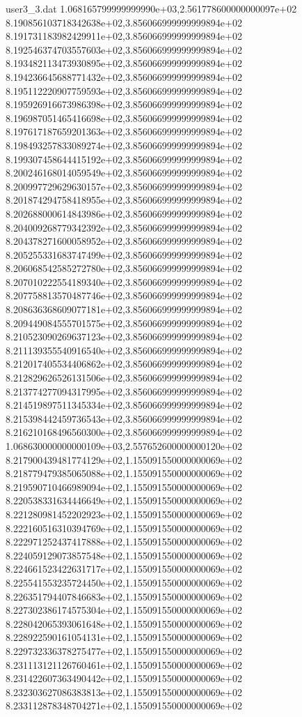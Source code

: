 \begin{filecontents}{user3_3.dat}
1.068165799999999990e+03,2.561778600000000097e+02
8.190856103718342638e+02,3.856066999999999894e+02
8.191731183982429911e+02,3.856066999999999894e+02
8.192546374703557603e+02,3.856066999999999894e+02
8.193482113473930895e+02,3.856066999999999894e+02
8.194236645688771432e+02,3.856066999999999894e+02
8.195112220907759593e+02,3.856066999999999894e+02
8.195926916673986398e+02,3.856066999999999894e+02
8.196987051465416698e+02,3.856066999999999894e+02
8.197617187659201363e+02,3.856066999999999894e+02
8.198493257833089274e+02,3.856066999999999894e+02
8.199307458644415192e+02,3.856066999999999894e+02
8.200246168014059549e+02,3.856066999999999894e+02
8.200997729629630157e+02,3.856066999999999894e+02
8.201874294758418955e+02,3.856066999999999894e+02
8.202688000614843986e+02,3.856066999999999894e+02
8.204009268779342392e+02,3.856066999999999894e+02
8.204378271600058952e+02,3.856066999999999894e+02
8.205255331683747499e+02,3.856066999999999894e+02
8.206068542585272780e+02,3.856066999999999894e+02
8.207010222554189340e+02,3.856066999999999894e+02
8.207758813570487746e+02,3.856066999999999894e+02
8.208636368609077181e+02,3.856066999999999894e+02
8.209449084555701575e+02,3.856066999999999894e+02
8.210523090269637123e+02,3.856066999999999894e+02
8.211139355540916540e+02,3.856066999999999894e+02
8.212017405534406862e+02,3.856066999999999894e+02
8.212829626526131506e+02,3.856066999999999894e+02
8.213774277094317995e+02,3.856066999999999894e+02
8.214519897511345334e+02,3.856066999999999894e+02
8.215398442459736543e+02,3.856066999999999894e+02
8.216210168496560300e+02,3.856066999999999894e+02
1.068630000000000109e+03,2.557652600000000120e+02
8.217900439481774129e+02,1.155091550000000069e+02
8.218779479385065088e+02,1.155091550000000069e+02
8.219590710466989094e+02,1.155091550000000069e+02
8.220538331634446649e+02,1.155091550000000069e+02
8.221280981452202923e+02,1.155091550000000069e+02
8.222160516310394769e+02,1.155091550000000069e+02
8.222971252437417888e+02,1.155091550000000069e+02
8.224059129073857548e+02,1.155091550000000069e+02
8.224661523422631717e+02,1.155091550000000069e+02
8.225541553235724450e+02,1.155091550000000069e+02
8.226351794407846683e+02,1.155091550000000069e+02
8.227302386174575304e+02,1.155091550000000069e+02
8.228042065393061648e+02,1.155091550000000069e+02
8.228922590161054131e+02,1.155091550000000069e+02
8.229732336378275477e+02,1.155091550000000069e+02
8.231113121126760461e+02,1.155091550000000069e+02
8.231422607363490442e+02,1.155091550000000069e+02
8.232303627086383813e+02,1.155091550000000069e+02
8.233112878348704271e+02,1.155091550000000069e+02

\end{filecontents}
